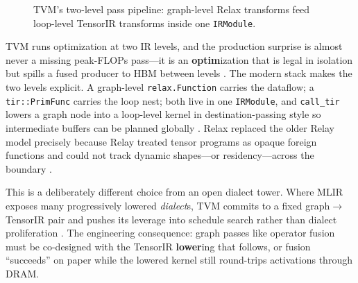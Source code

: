 \begin{figure}[t]
\centering
{}
\caption{TVM's two-level pass pipeline: graph-level Relax transforms feed loop-level TensorIR transforms inside one \texttt{IRModule}.}
\label{fig:tvm_arch_passes_architecture}
\end{figure}

TVM runs optimization at two IR levels, and the production surprise is almost never a missing peak-FLOPs pass---it is an \textbf{optim}ization that is legal in isolation but spills a fused producer to HBM between levels \citep{chen2018tvm,yirage2026}. The modern stack makes the two levels explicit. A graph-level \texttt{relax.Function} carries the dataflow; a \texttt{tir::PrimFunc} carries the loop nest; both live in one \texttt{IRModule}, and \texttt{call\_tir} lowers a graph node into a loop-level kernel in destination-passing style so intermediate buffers can be planned globally \citep{lai2023relax}. Relax replaced the older Relay model precisely because Relay treated tensor programs as opaque foreign functions and could not track dynamic shapes---or residency---across the boundary \citep{lai2023relax}.

This is a deliberately different choice from an open dialect tower. Where MLIR exposes many progressively lowered \emph{dialect}s, TVM commits to a fixed graph$\to$TensorIR pair and pushes its leverage into schedule search rather than dialect proliferation \citep{chen2018tvm,lai2023relax}. The engineering consequence: graph passes like operator fusion must be co-designed with the TensorIR \textbf{lower}ing that follows, or fusion ``succeeds'' on paper while the lowered kernel still round-trips activations through DRAM.

